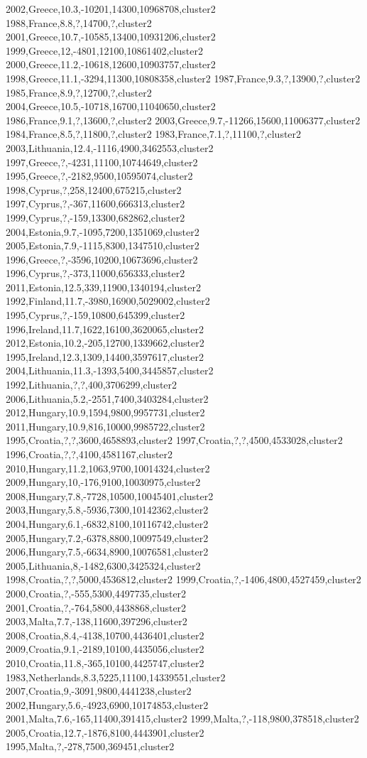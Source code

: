 2002,Greece,10.3,-10201,14300,10968708,cluster2
1988,France,8.8,?,14700,?,cluster2
2001,Greece,10.7,-10585,13400,10931206,cluster2
1999,Greece,12,-4801,12100,10861402,cluster2
2000,Greece,11.2,-10618,12600,10903757,cluster2
1998,Greece,11.1,-3294,11300,10808358,cluster2
1987,France,9.3,?,13900,?,cluster2
1985,France,8.9,?,12700,?,cluster2
2004,Greece,10.5,-10718,16700,11040650,cluster2
1986,France,9.1,?,13600,?,cluster2
2003,Greece,9.7,-11266,15600,11006377,cluster2
1984,France,8.5,?,11800,?,cluster2
1983,France,7.1,?,11100,?,cluster2
2003,Lithuania,12.4,-1116,4900,3462553,cluster2
1997,Greece,?,-4231,11100,10744649,cluster2
1995,Greece,?,-2182,9500,10595074,cluster2
1998,Cyprus,?,258,12400,675215,cluster2
1997,Cyprus,?,-367,11600,666313,cluster2
1999,Cyprus,?,-159,13300,682862,cluster2
2004,Estonia,9.7,-1095,7200,1351069,cluster2
2005,Estonia,7.9,-1115,8300,1347510,cluster2
1996,Greece,?,-3596,10200,10673696,cluster2
1996,Cyprus,?,-373,11000,656333,cluster2
2011,Estonia,12.5,339,11900,1340194,cluster2
1992,Finland,11.7,-3980,16900,5029002,cluster2
1995,Cyprus,?,-159,10800,645399,cluster2
1996,Ireland,11.7,1622,16100,3620065,cluster2
2012,Estonia,10.2,-205,12700,1339662,cluster2
1995,Ireland,12.3,1309,14400,3597617,cluster2
2004,Lithuania,11.3,-1393,5400,3445857,cluster2
1992,Lithuania,?,?,400,3706299,cluster2
2006,Lithuania,5.2,-2551,7400,3403284,cluster2
2012,Hungary,10.9,1594,9800,9957731,cluster2
2011,Hungary,10.9,816,10000,9985722,cluster2
1995,Croatia,?,?,3600,4658893,cluster2
1997,Croatia,?,?,4500,4533028,cluster2
1996,Croatia,?,?,4100,4581167,cluster2
2010,Hungary,11.2,1063,9700,10014324,cluster2
2009,Hungary,10,-176,9100,10030975,cluster2
2008,Hungary,7.8,-7728,10500,10045401,cluster2
2003,Hungary,5.8,-5936,7300,10142362,cluster2
2004,Hungary,6.1,-6832,8100,10116742,cluster2
2005,Hungary,7.2,-6378,8800,10097549,cluster2
2006,Hungary,7.5,-6634,8900,10076581,cluster2
2005,Lithuania,8,-1482,6300,3425324,cluster2
1998,Croatia,?,?,5000,4536812,cluster2
1999,Croatia,?,-1406,4800,4527459,cluster2
2000,Croatia,?,-555,5300,4497735,cluster2
2001,Croatia,?,-764,5800,4438868,cluster2
2003,Malta,7.7,-138,11600,397296,cluster2
2008,Croatia,8.4,-4138,10700,4436401,cluster2
2009,Croatia,9.1,-2189,10100,4435056,cluster2
2010,Croatia,11.8,-365,10100,4425747,cluster2
1983,Netherlands,8.3,5225,11100,14339551,cluster2
2007,Croatia,9,-3091,9800,4441238,cluster2
2002,Hungary,5.6,-4923,6900,10174853,cluster2
2001,Malta,7.6,-165,11400,391415,cluster2
1999,Malta,?,-118,9800,378518,cluster2
2005,Croatia,12.7,-1876,8100,4443901,cluster2
1995,Malta,?,-278,7500,369451,cluster2
